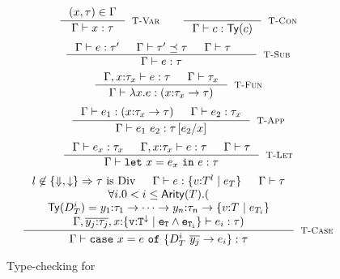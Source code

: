 \begin{figure}[t!]
$$
\inference{
	(x,\tau) \in \Gamma 
}{
	\hastype{\Gamma}{x}{\tau}
}[\rtvar]
\qquad
\inference{
}{
	\hastype{\Gamma}{c}{\constty{c}}
}[\rtconst]
$$
$$
\inference{
	\hastype{\Gamma}{e}{\tau'} &&
	\issubtype{\Gamma}{\tau'}{\tau} &&
	\iswellformed{\Gamma}{\tau} &&
}{
	\hastype{\Gamma}{e}{\tau}
}[\rtsub]
$$
$$
\inference{
	\hastype{\Gamma, x\colon\tau_x}{e}{\tau} &&
	\iswellformed{\Gamma}{\tau_x}
}{
	\hastype{\Gamma}{\efun{x}{\tau_x}{e}}{(\tfun{x}{\tau_x}{\tau})}
}[\rtfun]
$$
$$
\inference{
	\hastype{\Gamma}{e_1}{(\tfunref{x}{\tau_{x}}{\tau}{v}{e_v})} &&
	\hastype{\Gamma}{\restrictdecidable{y}{e_2}}{\tau_{x}}
}{
	\hastype{\Gamma}{\eapp{e_1}{\restrictdecidable{y}{e_2}}}{\tau\sub{x}{\restrictdecidable{y}{e_2}}}
}[\rtapp]
$$
$$
\inference{
	\hastype{\Gamma}{e_x}{\tau_{x}} &&
	\hastype{\Gamma,x\colon\tau_x}{e}{\tau} &&
	\iswellformed{\Gamma}{\tau}
}{
	\hastype{\Gamma}{\elet{x}{e_x}{e}}{\tau}
}[\rtlet]
$$
$$\inference{
	l \not \in \{\finite, \trivial\} \Rightarrow \tau \ \text{is}\ \Div &&
	\hastype{\Gamma}{e}{\tref{v}{T}{l}{e_T}} &&
	 \iswellformed{\Gamma}{\tau}\\
	\forall i. 0 < i \leq \arity{T}. (\\
		\constty{D^i_T} = \tfun{y_1}{\tau_1}{\dots\rightarrow\tfun{y_n}{\tau_n}{\tref{v}{T}{}{e_{T_i}}}} \\
		\hastype{\Gamma,  
				\overline{y_j\colon \tau_j},
				x\colon\tlref{v}{T}{\restrictdecidable{\trivial}
				{\addtechnical{}{\ltrivial}}
				}{e_T \land e_{T_i}}}{e_i}{\tau}	
	)\\
}{
	\hastype{\Gamma}{\ecase{e}{D^i_T}{\overline{y_j}}{e_i}{x}}{\tau}
}[\rtcase]$$
\caption{Type-checking for \undeclang}
\label{fig:proofs:typing}
\end{figure}

